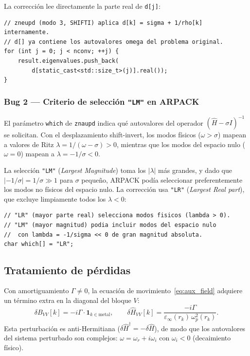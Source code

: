 \documentclass[12pt,a4paper]{article}
\newcommand{\Hhat}{\hat{H}}
\newcommand{\omegap}{\omega_p}
\newcommand{\epsinf}{\varepsilon_\infty}
\begin{document}
La corrección lee directamente la parte real de \texttt{d[j]}:
\begin{lstlisting}[style=cpp, caption={Código corregido en \texttt{eigensolver.cpp}}]
// zneupd (modo 3, SHIFTI) aplica d[k] = sigma + 1/rho[k] internamente.
// d[] ya contiene los autovalores omega del problema original.
for (int j = 0; j < nconv; ++j) {
    result.eigenvalues.push_back(
        d[static_cast<std::size_t>(j)].real());
}
\end{lstlisting}

\subsubsection{Bug 2 --- Criterio de selección \texttt{"LM"} en ARPACK}

El parámetro \texttt{which} de \texttt{znaupd} indica qué autovalores
del operador $(\Hhat - \sigma I)^{-1}$ se solicitan.
Con el desplazamiento shift-invert, los modos físicos ($\omega > \sigma$)
mapean a valores de Ritz $\lambda = 1/(\omega-\sigma) > 0$, mientras
que los modos del espacio nulo ($\omega = 0$) mapean a
$\lambda = -1/\sigma < 0$.

La selección \texttt{"LM"} (\emph{Largest Magnitude}) toma los $|\lambda|$
más grandes, y dado que $|-1/\sigma| = 1/\sigma \gg 1$ para $\sigma$
pequeño, ARPACK podía seleccionar preferentemente los modos no físicos
del espacio nulo.
La corrección usa \texttt{"LR"} (\emph{Largest Real part}), que excluye
limpiamente todos los $\lambda < 0$:

\begin{lstlisting}[style=cpp, caption={Corrección del criterio ARPACK en \texttt{eigensolver.cpp}}]
// "LR" (mayor parte real) selecciona modos fisicos (lambda > 0).
// "LM" (mayor magnitud) podia incluir modos del espacio nulo
//  con lambda = -1/sigma << 0 de gran magnitud absoluta.
char which[] = "LR";
\end{lstlisting}

\subsection{Tratamiento de pérdidas}

\label{sec:losses}

Con amortiguamiento $\Gamma \neq 0$, la ecuación de movimiento~\eqref{eq:aux_field}
adquiere un término extra en la diagonal del bloque $V$:
\begin{equation}
  \delta B_{VV}[k] = -i\Gamma\cdot\mathbf{1}_{k\in\text{metal}},
  \qquad
  \delta\Hhat_{VV}[k] = \frac{-i\Gamma}{\epsinf(r_k)\,\omegap^2(r_k)}.
  \label{eq:delta_H}
\end{equation}
Esta perturbación es anti-Hermitiana ($\delta\Hhat^\dagger = -\delta\Hhat$),
de modo que los autovalores del sistema perturbado son complejos:
$\omega = \omega_r + i\omega_i$ con $\omega_i < 0$ (decaimiento físico).
\end{document}
